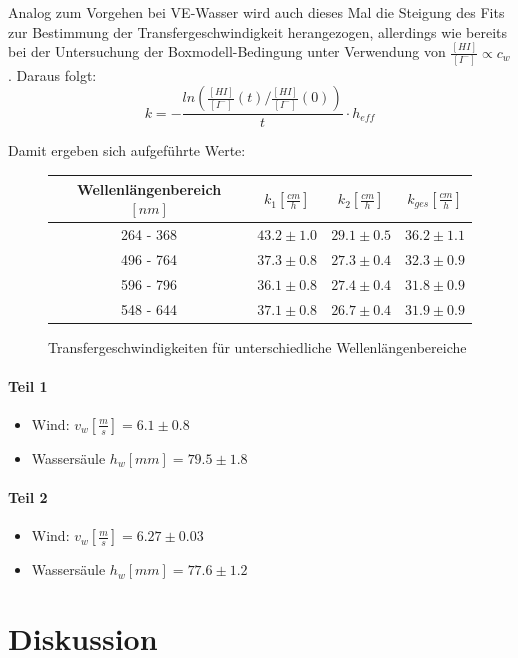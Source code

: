 \documentclass[12pt]{article}
\begin{document}
Analog zum Vorgehen bei VE-Wasser wird auch dieses Mal die Steigung des Fits zur Bestimmung der Transfergeschwindigkeit
herangezogen, allerdings wie bereits bei der Untersuchung der Boxmodell-Bedingung unter Verwendung von $\frac{[HI]}{[I^-]} \propto c_w $.
Daraus folgt:
\begin{equation}
k = - \frac{ln(\frac{[HI]}{[I^-]}(t)/\frac{[HI]}{[I^-]}(0))}{t} \cdot h_{eff}
\end{equation}

Damit ergeben sich aufgeführte Werte:

\begin{figure}[H]
	\centering
	\begin{tabular}{c|c|c|c}
		Wellenlängenbereich $[nm]$ & $k_1 [\frac{cm}{h}]$ & $k_2 [\frac{cm}{h}]$ & $k_{ges} [\frac{cm}{h}] $ \\ \hline
		264 - 368 & $43.2 \pm 1.0$ & $29.1 \pm 0.5$ & $36.2 \pm 1.1$ \\
		496 - 764 & $37.3 \pm 0.8$ & $27.3 \pm 0.4$ & $32.3 \pm 0.9$ \\
		596 - 796 & $36.1 \pm 0.8$ & $27.4 \pm 0.4$ & $31.8 \pm 0.9$ \\
		548 - 644 & $37.1 \pm 0.8$ & $26.7 \pm 0.4$ & $31.9 \pm 0.9$
	\end{tabular}
	\caption{Transfergeschwindigkeiten für unterschiedliche Wellenlängenbereiche}
\end{figure}

\paragraph{Teil 1}
\begin{itemize}
	\item Wind: $v_w [\frac{m}{s}] = 6.1 \pm 0.8 $
	\item Wassersäule $h_w[mm] = 79.5 \pm 1.8 $
\end{itemize}
\paragraph{Teil 2}
\begin{itemize}
	\item Wind: $v_w [\frac{m}{s}] = 6.27 \pm 0.03 $
	\item Wassersäule $h_w[mm] = 77.6 \pm 1.2 $
\end{itemize}

\section{Diskussion}
\end{document}
